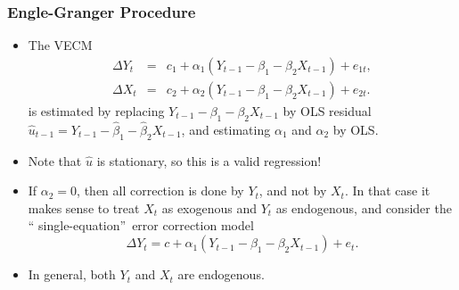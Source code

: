 \begin{frame}%

\frametitle{Engle-Granger Procedure}
\begin{itemize}
\item
The VECM
\begin{eqnarray*}
\Delta Y_{t} &=&c_1+\alpha _{1}(Y_{t-1}-\beta _{1}-\beta _{2}X_{t-1})+e_{1t}, \\
\Delta X_{t} &=&c_2+\alpha _{2}(Y_{t-1}-\beta _{1}-\beta _{2}X_{t-1})+e_{2t}.
\end{eqnarray*}
is estimated by replacing $Y_{t-1}-\beta _{1}-\beta _{2}X_{t-1}$
by OLS residual $\hat{u}_{t-1}=Y_{t-1}-\hat{\beta}_{1}-\hat{\beta}%
_{2}X_{t-1} $, and estimating $\alpha _{1}$ and $\alpha _{2}$ by OLS.
\item Note that $\hat{u}$ is stationary, so this is a valid regression!
\item If $\alpha _{2}=0$, then all correction is done by $Y_{t}$, and not by
$X_{t}$. In that case it makes sense to treat $X_{t}$ as exogenous and $%
Y_{t} $ as endogenous, and consider the \textquotedblleft
single-equation\textquotedblright\ error correction model%
\begin{equation*}
\Delta Y_{t}=c+\alpha_1 (Y_{t-1}-\beta _{1}-\beta _{2}X_{t-1}) +e_{t}.
\end{equation*}%

\item In general, both $Y_{t}$ and $X_{t}$ are endogenous.
\end{itemize}

\end{frame}%

